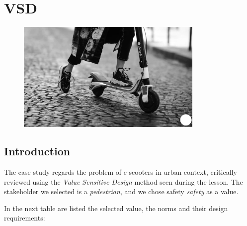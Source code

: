 \chapter{VSD}
\begin{figure}[h]
\centering
\includegraphics[width=0.8\textwidth]{Capitoli_Report/2.1_VSD.png}
\caption{\cite{vsdpic}}
\label{fig:vsd}
\end{figure}
\newpage
\pagestyle{plain}
\section{Introduction}
The case study regards the problem of e-scooters in urban context, critically reviewed using the \textit{Value Sensitive Design} method seen during the lesson. The stakeholder we selected is a \textit{pedestrian}, and we chose safety \textit{safety} as a value.

In the next table are listed the selected value, the norms and their design requirements:

